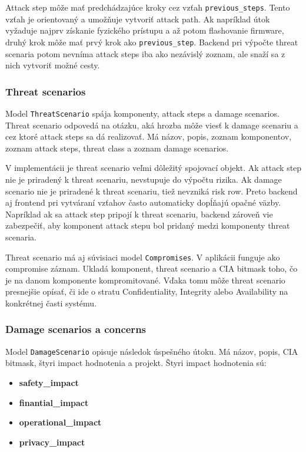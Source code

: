 \documentclass[11pt]{article}
\begin{document}
Attack step môže mať predchádzajúce kroky cez vzťah \texttt{previous\_steps}. Tento vzťah je orientovaný a umožňuje vytvoriť attack path. Ak napríklad útok vyžaduje najprv získanie fyzického prístupu a až potom flashovanie firmware, druhý krok môže mať prvý krok ako \texttt{previous\_step}. Backend pri výpočte threat scenaria potom nevníma attack steps iba ako nezávislý zoznam, ale snaží sa z nich vytvoriť možné cesty.

\subsubsection{Threat scenarios}

Model \texttt{ThreatScenario} spája komponenty, attack steps a damage scenarios. Threat scenario odpovedá na otázku, aká hrozba môže viesť k damage scenariu a cez ktoré attack steps sa dá realizovať. Má názov, popis, zoznam komponentov, zoznam attack steps, threat class a zoznam damage scenarios.

V implementácii je threat scenario veľmi dôležitý spojovací objekt. Ak attack step nie je priradený k threat scenariu, nevstupuje do výpočtu rizika. Ak damage scenario nie je priradené k threat scenariu, tiež nevzniká risk row. Preto backend aj frontend pri vytváraní vzťahov často automaticky dopĺňajú opačné väzby. Napríklad ak sa attack step pripojí k threat scenariu, backend zároveň vie zabezpečiť, aby komponent attack stepu bol pridaný medzi komponenty threat scenaria.

Threat scenario má aj súvisiaci model \texttt{Compromises}. V aplikácii funguje ako compromise záznam. Ukladá komponent, threat scenario a CIA bitmask toho, čo je na danom komponente kompromitované. Vďaka tomu môže threat scenario presnejšie opísať, či ide o stratu Confidentiality, Integrity alebo Availability na konkrétnej časti systému.

\subsubsection{Damage scenarios a concerns}

Model \texttt{DamageScenario} opisuje následok úspešného útoku. Má názov, popis, CIA bitmask, štyri impact hodnotenia a projekt. Štyri impact hodnotenia sú:

\begin{itemize}
    \item \textbf{safety\_impact}
    \item \textbf{finantial\_impact}
    \item \textbf{operational\_impact}
    \item \textbf{privacy\_impact}
\end{itemize}
\end{document}
